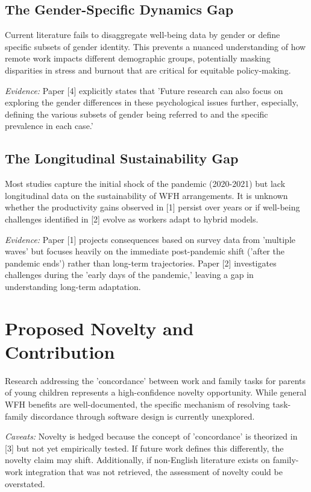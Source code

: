 \documentclass[11pt]{article}
\begin{document}
\subsection{The Gender-Specific Dynamics Gap}
Current literature fails to disaggregate well-being data by gender or define specific subsets of gender identity. This prevents a nuanced understanding of how remote work impacts different demographic groups, potentially masking disparities in stress and burnout that are critical for equitable policy-making.

\textit{Evidence:} Paper [4] explicitly states that 'Future research can also focus on exploring the gender differences in these psychological issues further, especially, defining the various subsets of gender being referred to and the specific prevalence in each case.'

\subsection{The Longitudinal Sustainability Gap}
Most studies capture the initial shock of the pandemic (2020-2021) but lack longitudinal data on the sustainability of WFH arrangements. It is unknown whether the productivity gains observed in [1] persist over years or if well-being challenges identified in [2] evolve as workers adapt to hybrid models.

\textit{Evidence:} Paper [1] projects consequences based on survey data from 'multiple waves' but focuses heavily on the immediate post-pandemic shift ('after the pandemic ends') rather than long-term trajectories. Paper [2] investigates challenges during the 'early days of the pandemic,' leaving a gap in understanding long-term adaptation.

\section{Proposed Novelty and Contribution}
Research addressing the 'concordance' between work and family tasks for parents of young children represents a high-confidence novelty opportunity. While general WFH benefits are well-documented, the specific mechanism of resolving task-family discordance through software design is currently unexplored.

\textit{Caveats:} Novelty is hedged because the concept of 'concordance' is theorized in [3] but not yet empirically tested. If future work defines this differently, the novelty claim may shift. Additionally, if non-English literature exists on family-work integration that was not retrieved, the assessment of novelty could be overstated.
\end{document}
